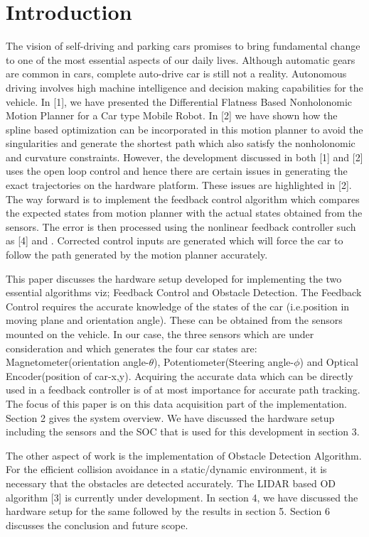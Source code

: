 \documentclass[conference]{IEEEtran}
\begin{document}
\IEEEpeerreviewmaketitle




\section{Introduction}
The vision of self-driving and parking cars promises to bring fundamental change to one of the most essential aspects of our daily lives. 
Although automatic gears are common in cars, complete auto-drive car is still not a reality. 
Autonomous driving involves high machine intelligence and decision making capabilities for the vehicle.
In [1], we have presented the Differential Flatness Based Nonholonomic Motion Planner for a Car type Mobile Robot. In [2] we have shown how the spline based optimization can be incorporated in this motion planner to avoid the singularities and generate the shortest path which also satisfy the nonholonomic and curvature constraints. However, the development discussed in both [1] and [2] uses the open loop control and hence there are certain issues in generating the exact trajectories on the hardware platform. These issues are highlighted in [2]. The way forward is to implement the feedback control algorithm which compares the expected states from motion planner with the actual states obtained from the sensors. The error is then processed using the nonlinear feedback controller such as [4] and \cite{paper45}.  Corrected control inputs are generated which will force the car to follow the path generated by the motion planner accurately. 

This paper discusses the hardware setup developed for implementing the two essential algorithms viz; Feedback Control and Obstacle Detection. The Feedback Control requires the accurate knowledge of the states of the car (i.e.position in moving plane and orientation angle). These can be obtained from the sensors mounted on the vehicle. In our case, the three sensors which are under consideration and which generates the four car states are: Magnetometer(orientation angle-$ \theta $), Potentiometer(Steering angle-$ \phi $) and Optical Encoder(position of car-x,y). Acquiring the accurate data which can be directly used in a feedback controller is of at most importance for accurate path tracking. The focus of this paper is on this data acquisition part of the implementation. Section 2 gives the system overview. We have discussed the hardware setup including the sensors and the SOC that is used for this development in section 3. 

The other aspect of work is the implementation of Obstacle Detection Algorithm. For the efficient collision avoidance in a static/dynamic environment, it is necessary that the obstacles are detected accurately. The LIDAR based OD algorithm [3] is currently under development. In section 4, we have discussed the hardware setup for the same followed by the results in section 5. Section 6 discusses the conclusion and future scope.  
\end{document}

